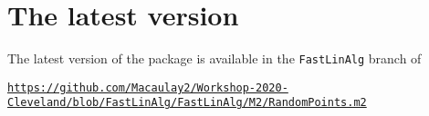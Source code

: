 \documentclass[11pt]{amsart}
\theoremstyle{definition}
\begin{document}

\section{The latest version}

The latest version of the package is available in the {\tt FastLinAlg} branch of 

\begin{center}
    {\scriptsize\tt\url{https://github.com/Macaulay2/Workshop-2020-Cleveland/blob/FastLinAlg/FastLinAlg/M2/RandomPoints.m2}}
\end{center}



\end{document}
